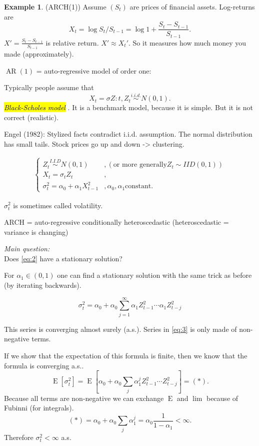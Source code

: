 \documentclass[12pt,a4paper, notitlepage]{book}
\newcommand{\hlc}[2][yellow]{ {\sethlcolor{#1} \hl{#2}} }
\theoremstyle{definition} %
\newtheorem{example}[definition]{Example}
\theoremstyle{plain} %
\DeclareMathOperator{\E}{E}
\DeclareMathOperator{\Ar}{AR}
\newcommand{\Important}[1]{ {\it \hlc{#1} } }
\newcommand{\QuestionStart}[1]{ {\it \sc #1} } %
\begin{document}
\begin{example}(ARCH(1))
Assume $(S_t)$ are prices of financial assets. Log-returns are 
\[X_t = \log{S_t / S_{t-1}} = \log{1 + \frac{S_t - S_{t-1}}{S_{t-1}}}. \]
 $ X' = \frac{S_t - S_{t-1}}{S_{t-1}} $ is relative return. 
$ X' \approx X_t'$. So it measures how much money you made (approximately).

$\Ar(1)$ = auto-regressive model of order one:

Typically people assume that 
\[ X_t = \sigma Z:t ,  Z_t  \overset{i.i.d.}{\sim} N(0,1). \]
 \Important{Black-Scholes model}. It is a benchmark model, because it is simple. But it is not correct (realistic).



Engel (1982):
Stylized facts contradict i.i.d. assumption. The normal distribution has small tails. Stock prices go up and down -> clustering.


\begin{align}
\begin{cases}
Z_t \overset{I.I.D}{\sim}  N(0,1) & , ( \text{or more generally} Z_t \sim IID(0,1) ) \\
X_t = \sigma_t Z_t & , \\
\sigma_t^2 = \alpha_0 + \alpha_1 X_{t-1}^2 &, \alpha_0, \alpha_1 \text{constant}. 
\end{cases}
\label{eq:2}
\end{align}

$\sigma_t^2$ is sometimes called volatility.
 

ARCH = auto-regressive conditionally heteroscedastic (heteroscedastic = variance is changing)

\QuestionStart{Main question:}  \\ Does 
\ref{eq:2} have a stationary solution? 

For $\alpha_1 \in (0,1)$ one can find a stationary solution with the same trick as before (by iterating backwards).

\[ \sigma_t^2 = \alpha_0 + \alpha_0 \sum_{j = 1}^\infty \alpha_1 Z_{t-1}^2 \cdots \alpha_1Z_{t-j}^2 
\label{eq:3} \] 



This series is converging almost surely (a.s.). 
Series in 
\ref{eq:3} is only made of non-negative terms. 

If we show that the expectation of this formula is finite, then we know that the formula is converging a.s..
\[ \E[ \sigma_t^2] = \E\left[\alpha_0 + \alpha_0 \sum_j \alpha_1^j Z_{t-1}^2 \cdots Z_{t-j}^2 \right]  = (*). \]
Because all terms are non-negative we can exchange $ \E$ and  $\lim$ because of Fubinni (for integrals).
\[ (*) = \alpha_0 + \alpha_0 \sum_j \alpha_1^j = \alpha_0 \frac{1}{1-\alpha_1} < \infty. \]
 Therefore $\sigma_t^2 < \infty$ a.s.


\end{example}
\end{document}
